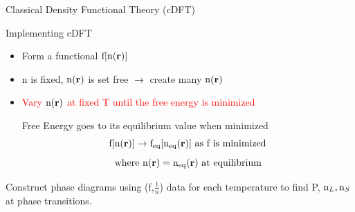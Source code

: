 \documentclass{beamer}
\renewcommand{\vec}[1]{\mathbf{#1}}
\begin{document}
\begin{frame}{Classical Density Functional Theory (cDFT)}
    \begin{block}{Implementing cDFT}
    \begin{itemize}
       \item Form a functional $\text f[\text n(\vec r)]$  \checkmark
       \item n is fixed, $\text n(\vec{r})$ is set free $\rightarrow$ create many $\text n(\vec{r})$ \checkmark
       \item \textcolor{red}{Vary $\text n(\vec{r})$ at fixed T until the free energy is minimized} 
       
       Free Energy goes to its equilibrium value when minimized      
       \begin{displaymath}\text f[\text n(\vec r)]\rightarrow \text f_{\text{eq}}[\text n_{\text{eq}}(\vec r)]  \mbox{ as f is minimized} \end{displaymath}
       \begin{displaymath}{\mbox{where }  \text n(\vec{r}) = \text n_{\text{eq}}(\vec r)  \mbox{ at equilibrium}}\end{displaymath}              
    \end{itemize}   
    
       Construct phase diagrams using (f,$\frac{1}{n}$) data for each temperature to find P, $\text n_L, \text n_S$  at phase transitions.
 
     \end{block}
\end{frame}
\end{document}
